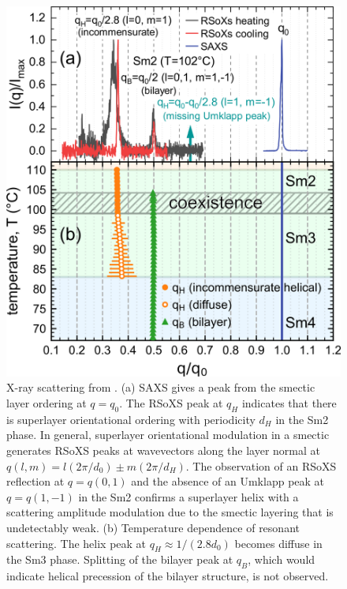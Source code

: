 \documentclass[aagreenthesis]{subfiles}
\begin{document}
\begin{figure}
    \centering
    \includegraphics[width=.6\textwidth]{figs/pal30/fromPaper/finalFigs/xray-combined.png}
    \caption{\label{fig:xray-results}X-ray scattering from .
        (a) SAXS gives a peak from the smectic layer ordering at $q=q_0$.
        The RSoXS peak at $q_H$ indicates that there is superlayer orientational ordering with periodicity $d_H$
        in the Sm2 phase.
        In general, superlayer orientational modulation in a smectic generates RSoXS peaks at wavevectors along the layer normal at
        $q(l,m) = l(2\pi/d_0) \pm m(2\pi/d_H)$\cite{levelut1999tensorial}.  The
        observation of an RSoXS reflection at $q = q(0,1)$ and the absence of an Umklapp peak at $q = q(1,-1)$  in
        the Sm2 confirms a superlayer helix with a scattering amplitude
        modulation due to the smectic layering that is undetectably weak.
        (b) Temperature dependence of resonant scattering. The helix peak at $q_H \approx1/(2.8 d_0)$ becomes diffuse in the Sm3 phase. Splitting
        of the bilayer peak at $q_B$, which would indicate helical precession of the bilayer structure, is not observed.
        }
\end{figure}
\end{document}

